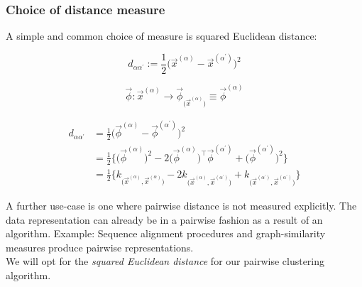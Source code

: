 \begin{frame}\frametitle{Choice of distance measure}

A simple and common choice of measure is squared Euclidean distance:

\begin{equation}
\label{eq:pairwisedisteuclidean}
d_{\alpha \alpha^{'}} := \frac{1}{2} \big(
    \vec{x}^{(\alpha)} - \vec{x}^{(\alpha^{'})} \big)^2
\end{equation}


$$
          \vec{\phi}: \vec{x}^{(\alpha)} \rightarrow
          \vec{\phi}_{\big( \vec{x}^{(\alpha)} \big)}
          \equiv \vec{\phi}^{(\alpha)}
$$

\begin{align}
			d_{\alpha \alpha^{'}} 
			& = \frac{1}{2} \big( \vec{\phi}^{(\alpha)} 
				- \vec{\phi}^{(\alpha^{'})} \big)^2 \\
			& = \frac{1}{2} \Big\{ \big( \vec{\phi}^{(\alpha)}
				\big)^2 - 2\big( \vec{\phi}^{(\alpha)} \big)^\top
				\vec{\phi}^{(\alpha^{'})} + \big(
				\vec{\phi}^{(\alpha^{'})} \big)^2 \Big\} \\
			& = \frac{1}{2} \bigg\{ k_{\big( \vec{x}^{(\alpha)},
				\vec{x}^{(\alpha)} \big)} 
				- 2k_{\big(\vec{x}^{(\alpha)},
				\vec{x}^{(\alpha^{'})} \big)}
				+ k_{\big(\vec{x}^{(\alpha^{'})},
				\vec{x}^{(\alpha^{'})} \big)}
				\bigg\}
\end{align}

\end{frame}

\begin{frame}

A further use-case is one where pairwise distance is not measured explicitly. The data representation can already be in a pairwise fashion as a result of an algorithm. Example: Sequence alignment procedures and graph-similarity measures produce pairwise representations.\\

We will opt for the \emph{squared Euclidean distance} for our pairwise clustering algorithm.

\end{frame}

